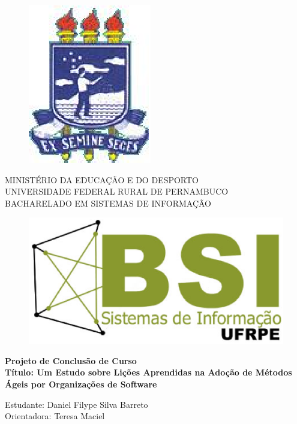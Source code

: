 \documentclass[a4paper,11pt]{article}
\begin{document}
\pagestyle {empty}

\vspace*{-2cm}
\begin{figure}[h]
\leavevmode
\begin{minipage}[t]{\textwidth}
\includegraphics[scale=0.7]{logo-ufrpe.eps}
\end{minipage}
\end{figure}

\vspace*{-3.0cm}
{\bf
\begin{center}
{
\hspace*{0cm} 	MINISTÉRIO DA EDUCAÇÃO E DO DESPORTO \\
\hspace*{.2in} UNIVERSIDADE FEDERAL RURAL DE PERNAMBUCO \\
\hspace*{.2in} BACHARELADO EM SISTEMAS DE INFORMAÇÃO} \\
\end{center}}
\vspace{0.0cm}
\noindent
\begin{figure}[h]
\centering
\includegraphics[scale=0.5]{Logo-bsi-presencial-v3-amp.eps}
\end{figure}
\vspace*{2.0cm}
\begin{center}

{\Large \bf  Projeto de Conclusão de Curso}\\[1cm]
{\Large \bf Título: Um Estudo sobre Lições Aprendidas na Adoção de Métodos Ágeis por Organizações de Software} \\[3cm]
\end{center}
{\Large  Estudante: Daniel Filype Silva Barreto}\\[6mm]
{\Large  Orientadora: Teresa Maciel}\\[6mm]
\end{document}

